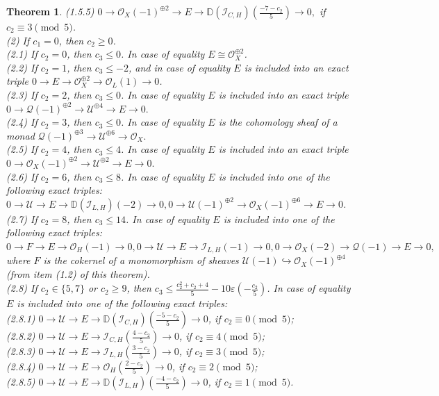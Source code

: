 \documentclass{amsart}
\newtheorem{theorem}{Theorem}[section]
\begin{document}
\begin{theorem}
	(1.5.5) $0\to \mathcal O_X(-1)^{\oplus 2}\to E\to \mathbb D(\mathcal I_{C,H})(\frac{-7-c_2}{5})\to 0,$ if $c_2 \equiv 3 \pmod 5$.\\
	(2) If $c_1=0$, then $c_2\ge 0$. \\
	(2.1) If $c_2=0$, then $c_3\le 0$. In case of equality $E\cong\mathcal O_X^{\oplus 2}$. \\
	(2.2) If $c_2=1$, then $c_3\le -2$, and in case of equality $E$ is included into an exact triple $0\to E\to\mathcal O_X^{\oplus 2}\to\mathcal O_L(1)\to 0$. \\
	(2.3) If $c_2=2$, then $c_3\le 0$. In case of equality $E$ is included into an exact triple $0\to \mathcal Q(-1)^{\oplus 2}\to\mathcal U^{\oplus 4}\to E\to 0.$ \\
	(2.4) If $c_2=3$, then $c_3\le 0$. In case of equality $E$ is the cohomology sheaf of a monad $\mathcal Q(-1)^{\oplus 3}\to\mathcal U^{\oplus 6}\to\mathcal O_X.$ \\
	(2.5) If $c_2=4$, then $c_3\le 4$. In case of equality $E$ is included into an exact triple $0\to\mathcal O_X(-1)^{\oplus 2}\to\mathcal U^{\oplus 2}\to E\to 0.$ \\
	(2.6) If $c_2=6$, then $c_3\le 8$. In case of equality $E$ is included into one of the following exact triples:
	$0\to\mathcal U\to E\to \mathbb D(\mathcal I_{L,H})(-2)\to 0, 0\to\mathcal U(-1)^{\oplus 2}\to\mathcal O_X(-1)^{\oplus 6}\to E\to 0$. \\
	(2.7) If $c_2=8$, then $c_3\le 14$. In case of equality $E$ is included into one of the following exact triples: $0\to F\to E\to \mathcal O_H(-1)\to 0, 0\to\mathcal U\to E\to \mathcal I_{L,H}(-1)\to 0, 0\to\mathcal O_X(-2)\to\mathcal Q(-1)\to E\to 0,$ where $F$ is the cokernel of a monomorphism of sheaves $\mathcal U(-1)\hookrightarrow\mathcal O_X(-1)^{\oplus 4}$ (from item (1.2) of this theorem). \\
	(2.8) If $c_2\in\{5,7\}$ or $c_2\ge 9$, then $c_3\le\frac{c_2^2+c_2+4}{5}-10\varepsilon(-\frac{c_2}{5})$. In case of equality $E$ is included into one of the following exact triples:\\
	(2.8.1) $0\to\mathcal U\to E\to \mathbb D(\mathcal I_{C,H})(\frac{-5-c_2}{5})\to 0$, if $c_2 \equiv 0 \pmod 5$; \\
	(2.8.2) $0\to\mathcal U\to E\to \mathcal I_{C,H}(\frac{4-c_2}{5})\to 0$, if $c_2 \equiv 4 \pmod 5$; \\
	(2.8.3) $0\to\mathcal U\to E\to \mathcal I_{L,H}(\frac{3-c_2}{5})\to 0$, if $c_2 \equiv 3 \pmod 5$; \\
	(2.8.4) $0\to\mathcal U\to E\to \mathcal O_H(\frac{2-c_2}{5})\to 0$, if $c_2 \equiv 2 \pmod 5$; \\
	(2.8.5) $0\to\mathcal U\to E\to \mathbb D(\mathcal I_{L,H})(\frac{-4-c_2}{5})\to 0$, if $c_2 \equiv 1 \pmod 5$.
	\end{theorem}
	
\end{document}
